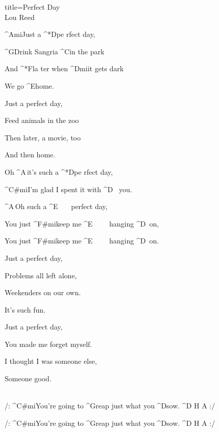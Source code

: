 \begin{song}{title=\predtitle\centering Perfect Day \\\large Lou Reed \vspace*{-0.3cm}}  %
\begin{centerjustified}

\sloka 
	^{Ami}Just a ^*{D}pe rfect day, 

	^{G\z }Drink Sangria ^{C}in the park

	And ^*{F}la ter when ^{Dmi}it gets dark

	We go ^{E\z }home.

\sloka
	Just a perfect day, 

	Feed animals in the zoo 

	Then later, a movie, too

	And then home. 
 
 
	Oh ^{A\,}it's such a ^*{D}pe rfect day, 

	^{C#mi}I'm glad I spent it with ^{D\,\,\,\,\,}you.

	^{A\,}Oh such a ^{E\,\,\,\,\,\,\,\,\,\,\,}perfect day, 

	You just ^{F#mi}keep me ^{E\,\,\,\,\,\,\,\,\,\,\,\,\,\,}hanging ^{D\,\,\,}on, 

	You just ^{F#mi}keep me ^{E\,\,\,\,\,\,\,\,\,\,\,\,\,\,}hanging ^{D\,\,\,}on. 
 
\sloka 
	Just a perfect day, 

	Problems all left alone, 

	Weekenders on our own. 

	It's such fun. 

\sloka
	Just a perfect day, 

	You made me forget myself. 
	
	I thought I was someone else, 
	
	Someone good. 


\\
 
	/: ^{C#mi}You're going to ^{G\z }reap just what you ^{D\z }sow.  ^{D\,\,H\,\,A} :/
 
 	/: ^{C#mi}You're going to ^{G\z }reap just what you ^{D\z }sow.  ^{D\,\,H\,\,A} :/\\
 	
 	

\end{centerjustified}
\setcounter{Slokočet}{0}
\end{song}
